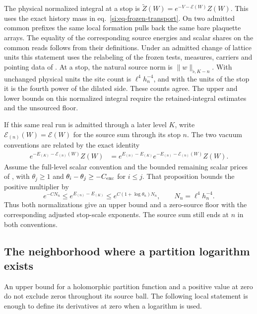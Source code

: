 \documentclass[11pt,letterpaper,reqno]{amsart}
\numberwithin{equation}{section}
\renewcommand{\eqref}[1]{\textup{eq.~\ref{#1}}}
\theoremstyle{definition}
\theoremstyle{remark}
\begin{document}
The physical normalized integral at a stop is
$\widetilde Z(W)=e^{-V-\mathcal E(W)} Z(W)$. This uses the exact
history mass in \eqref{si:eq-frozen-transport}. On two admitted
common prefixes the same local formation pulls back the
same bare plaquette arrays. The equality of the corresponding
source energies and scalar shares on the common reads follows
from their definitions. Under an admitted change of lattice units
this statement uses the relabeling of the frozen tests, measures,
carriers and pointing data of \cite{RT}. At a stop, the natural
source norm is $\|w\|_{\flat,K-n}$. With unchanged physical units
the site count is $\ell^4 h_n^{-4}$, and with the units of the stop
it is the fourth power of the dilated side. These counts agree.
The upper and lower bounds on this normalized integral require
the retained-integral estimates and the unsourced floor.

If this same real run is admitted through a later level $K$,
write $\mathcal E_{(n)}(W)=\mathcal E(W)$ for the source sum
through its stop $n$. The two vacuum conventions are related by
the exact identity
\begin{equation}\label{si:eq-stopped-vacuum-conversion}
 \begin{split}
 e^{-E_{(K)}-\mathcal E_{(n)}(W)}Z(W)
 &=e^{E_{(n)}-E_{(K)}}
       e^{-E_{(n)}-\mathcal E_{(n)}(W)}Z(W).
 \end{split}
\end{equation}
Assume the full-level scalar convention and the bounded remaining
scalar prices of \cite[Proposition~2.5]{RT}, with
$\theta_j\ge1$ and $\theta_i-\theta_j\ge-C_{\rm exc}$ for $i\le j$.
That proposition bounds the positive multiplier by
\[
 e^{-C N_n}\le e^{E_{(n)}-E_{(K)}}
              \le e^{C(1+\log\theta_n)N_n},
 \qquad N_n=\ell^4h_n^{-4}.
\]
Thus both normalizations give an upper bound and a zero-source
floor with the corresponding adjusted stop-scale exponents.
The source sum still ends at $n$ in both conventions.


\subsection{The neighborhood where a partition logarithm exists}
\label{si:subsec-local-log}

An upper bound for a holomorphic partition function and a positive
value at zero do not exclude zeros throughout its source ball. The
following local statement is enough to define its derivatives at
zero when a logarithm is used.
\end{document}
